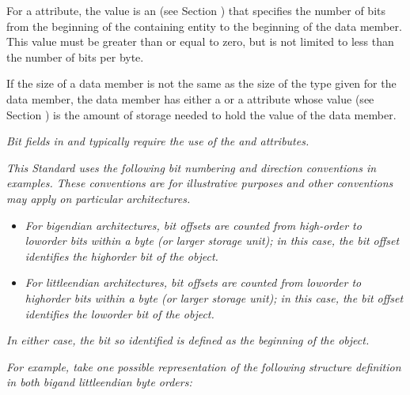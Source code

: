 For a  attribute, 
the value is an  
(see Section ) 
that specifies the number of bits
from the beginning of the containing entity to the beginning
of the data member. This value must be greater than or equal
to zero, but is not limited to less than the number of bits
per byte.

If the size of a data member is not the same as the size
of the type given for the data member, the data member has
either a  
or a  attribute whose
 value 
(see Section ) 
is the amount
of storage needed to hold the value of the data member.

\textit{Bit fields in  and  
typically 
require the use 
of 
the
 and 
 attributes.}

\textit{This Standard uses the following bit numbering and direction
conventions in examples. These conventions are for illustrative
purposes and other conventions may apply on particular
architectures.}
\begin{itemize}
\item \textit{For big\dash endian architectures, bit offsets are
counted from high-order to low\dash order bits within a byte (or
larger storage unit); in this case, the bit offset identifies
the high\dash order bit of the object.}

\item \textit{For little\dash endian architectures, bit offsets are
counted from low\dash order to high\dash order bits within a byte (or
larger storage unit); in this case, the bit offset identifies
the low\dash order bit of the object.}
\end{itemize}


\textit{In either case, the bit so identified is defined as the 
beginning of the object.}

\textit{For example, take one possible representation of the following 
 structure definition 
in both big\dash and little\dash endian byte orders:}

